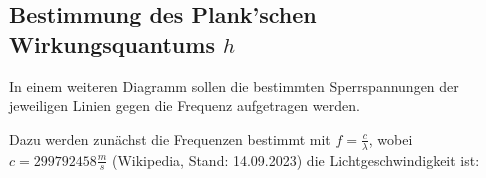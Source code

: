 \documentclass{article}
\begin{document}


\newpage

\subsection{Bestimmung des Plank'schen Wirkungsquantums $h$}

In einem weiteren Diagramm sollen die bestimmten Sperrspannungen der jeweiligen Linien gegen die Frequenz aufgetragen werden. 

Dazu werden zunächst die Frequenzen bestimmt mit $f=\frac{c}{\lambda}$, wobei $c=299 792 458 \frac{m}{s}$ (Wikipedia, Stand: 14.09.2023) die Lichtgeschwindigkeit ist:
\end{document}
